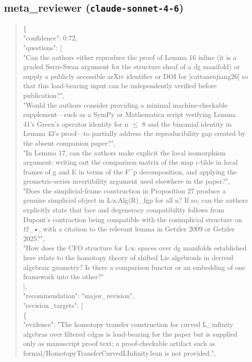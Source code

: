 \documentclass[11pt]{article}
\begin{document}
\subsection*{meta\_reviewer (\texttt{claude-sonnet-4-6})}
\begin{quote}\small\ttfamily\raggedright
\{\\
  "confidence": 0.72,\\
  "questions": [\\
    "Can the authors either reproduce the proof of Lemma 16 inline (it is a graded Serre-Swan argument for the structure sheaf of a dg manifold) or supply a publicly accessible arXiv identifier or DOI for [cattaneojiang26] so that this load-bearing input can be independently verified before publication?",\\
    "Would the authors consider providing a minimal machine-checkable supplement---such as a SymPy or Mathematica script verifying Lemma 41's Green's operator identity for n \ensuremath{\le} 8 and the binomial identity in Lemma 43's proof---to partially address the reproducibility gap created by the absent companion paper?",\\
    "In Lemma 17, can the authors make explicit the local isomorphism argument: writing out the comparison matrix of the map \ensuremath{\iota}-tilde in local frames of g and E in terms of the F\^{}p decomposition, and applying the geometric-series invertibility argument used elsewhere in the paper?",\\
    "Does the simplicial-frame construction in Proposition 27 produce a genuine simplicial object in L\ensuremath{\infty}Alg(R)\_fgp for all n? If so, can the authors explicitly state that face and degeneracy compatibility follows from Dupont's contraction being compatible with the cosimplicial structure on \ensuremath{\Omega}\_•, with a citation to the relevant lemma in Getzler 2009 or Getzler 2025?",\\
    "How does the CFO structure for L\ensuremath{\infty} spaces over dg manifolds established here relate to the homotopy theory of shifted Lie algebroids in derived algebraic geometry? Is there a comparison functor or an embedding of one framework into the other?"\\
  ],\\
  "recommendation": "major\_revision",\\
  "revision\_targets": [\\
    \{\\
      "evidence": "The homotopy transfer construction for curved L\_infinity algebras over filtered cdgas is load-bearing for the paper but is supplied only as manuscript proof text; a proof-checkable artifact such as formal/HomotopyTransferCurvedLInfinity.lean is not provided.",\\

\end{quote}
\end{document}
